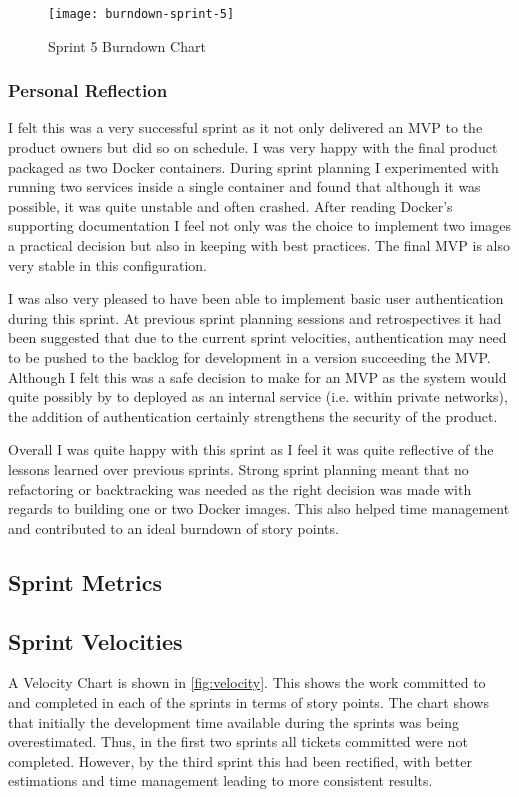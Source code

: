   \begin{figure}[H]
    \setlength{\belowcaptionskip}{15pt plus 3pt minus 2pt}
    \caption{Sprint 5 Burndown Chart}
    \centering
    \texttt{[image: burndown-sprint-5]}
    \label{fig:burndown-sprint-5}
  \end{figure}
  
  \subsubsection{Personal Reflection}
  I felt this was a very successful sprint as it not only delivered an MVP to the product owners but did so on schedule. I was very happy with the final product packaged as two Docker containers. During sprint planning I experimented with running two services inside a single container and found that although it was possible, it was quite unstable and often crashed. After reading Docker's supporting documentation I feel not only was the choice to implement two images a practical decision but also in keeping with best practices. The final MVP is also very stable in this configuration. 
  
  I was also very pleased to have been able to implement basic user authentication during this sprint. At previous sprint planning sessions and retrospectives it had been suggested that due to the current sprint velocities, authentication may need to be pushed to the backlog for development in a version succeeding the MVP. Although I felt this was a safe decision to make for an MVP as the system would quite possibly by to deployed as an internal service (i.e. within private networks), the addition of authentication certainly strengthens the security of the product.
  
  Overall I was quite happy with this sprint as I feel it was quite reflective of the lessons learned over previous sprints. Strong sprint planning meant that no refactoring or backtracking was needed as the right decision was made with regards to building one or two Docker images. This also helped time management and contributed to an ideal burndown of story points. 

	\subsection{Sprint Metrics}
  
  \subsection{Sprint Velocities}
  A Velocity Chart is shown in \autoref{fig:velocity}.  This shows the work committed to and completed in each of the sprints in terms of story points. The chart shows that initially the development time available during the sprints was being overestimated. Thus, in the first two sprints all tickets committed were not completed. However, by the third sprint this had been rectified, with better estimations and time management leading to  more consistent results.
  
